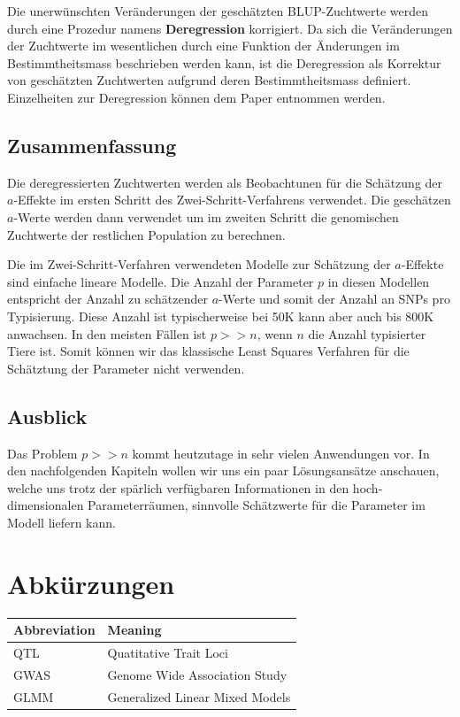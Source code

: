 \documentclass[]{book}
\begin{document}
Die unerwünschten Veränderungen der geschätzten BLUP-Zuchtwerte werden
durch eine Prozedur namens \textbf{Deregression} korrigiert. Da sich die
Veränderungen der Zuchtwerte im wesentlichen durch eine Funktion der
Änderungen im Bestimmtheitsmass beschrieben werden kann, ist die
Deregression als Korrektur von geschätzten Zuchtwerten aufgrund deren
Bestimmtheitsmass definiert. Einzelheiten zur Deregression können dem
Paper \citep{GTF2009} entnommen werden.

\section{Zusammenfassung}\label{zusammenfassung}

Die deregressierten Zuchtwerten werden als Beobachtunen für die
Schätzung der \(a\)-Effekte im ersten Schritt des
Zwei-Schritt-Verfahrens verwendet. Die geschätzen \(a\)-Werte werden
dann verwendet um im zweiten Schritt die genomischen Zuchtwerte der
restlichen Population zu berechnen.

Die im Zwei-Schritt-Verfahren verwendeten Modelle zur Schätzung der
\(a\)-Effekte sind einfache lineare Modelle. Die Anzahl der Parameter
\(p\) in diesen Modellen entspricht der Anzahl zu schätzender
\(a\)-Werte und somit der Anzahl an SNPs pro Typisierung. Diese Anzahl
ist typischerweise bei 50K kann aber auch bis 800K anwachsen. In den
meisten Fällen ist \(p >> n\), wenn \(n\) die Anzahl typisierter Tiere
ist. Somit können wir das klassische Least Squares Verfahren für die
Schätztung der Parameter nicht verwenden.

\section{Ausblick}\label{ausblick}

Das Problem \(p >> n\) kommt heutzutage in sehr vielen Anwendungen vor.
In den nachfolgenden Kapiteln wollen wir uns ein paar Lösungsansätze
anschauen, welche uns trotz der spärlich verfügbaren Informationen in
den hoch-dimensionalen Parameterräumen, sinnvolle Schätzwerte für die
Parameter im Modell liefern kann.

\chapter*{Abkürzungen}\label{abkurzungen}

\begin{tabular}{l|l}
\hline
Abbreviation & Meaning\\
\hline
QTL & Quatitative Trait Loci\\
\hline
GWAS & Genome Wide Association Study\\
\hline
GLMM & Generalized Linear Mixed Models\\
\hline
\end{tabular}


\end{document}
